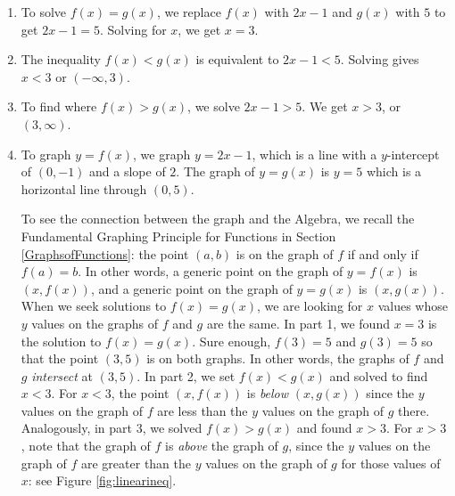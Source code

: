 {
\begin{enumerate}

\item  To solve $f(x) = g(x)$, we replace $f(x)$ with $2x-1$ and $g(x)$ with $5$ to get $2x-1 = 5$.  Solving for $x$, we get $x=3$.

\item  The inequality $f(x) < g(x)$ is equivalent to $2x-1 < 5$.  Solving gives $x < 3$ or $(-\infty, 3)$.

\item  To find where $f(x) > g(x)$, we solve $2x-1 > 5$.  We get $x > 3$, or $(3, \infty)$.

\item  To graph $y=f(x)$, we graph $y = 2x-1$, which is a line with a $y$-intercept of $(0,-1)$ and a slope of $2$.  The graph of $y=g(x)$ is $y=5$ which is a horizontal line through $(0,5)$.  


To see the connection between the graph and the Algebra, we recall the Fundamental Graphing Principle for Functions in Section \ref{GraphsofFunctions}:  the point $(a,b)$ is on the graph of $f$ if and only if $f(a)=b$.  In other words, a generic point on the graph of $y=f(x)$ is $(x,f(x))$, and a generic point on the graph of $y=g(x)$ is $(x,g(x))$.  When we seek solutions to $f(x)=g(x)$, we are looking for $x$ values whose $y$ values on the graphs of $f$ and $g$ are the same.  In part 1, we found $x=3$ is the solution to $f(x)=g(x)$.  Sure enough, $f(3) = 5$ and $g(3) = 5$ so that the point $(3,5)$ is on both graphs. In other words, the graphs of $f$ and $g$ \textit{intersect} at $(3,5)$.  In part 2, we set $f(x) < g(x)$ and solved to find $x < 3$.  For $x < 3$, the point $(x,f(x))$ is \textit{below} $(x,g(x))$ since the $y$ values on the graph of $f$ are less than the $y$ values on the graph of $g$ there.  Analogously, in part 3, we solved $f(x) > g(x)$ and found $x > 3$.  For $x > 3$, note that the graph of $f$ is \textit{above} the graph of $g$, since the $y$ values on the graph of $f$ are greater than the $y$ values on the graph of $g$ for those values of $x$: see Figure \ref{fig:linearineq}.
\end{enumerate}
}


